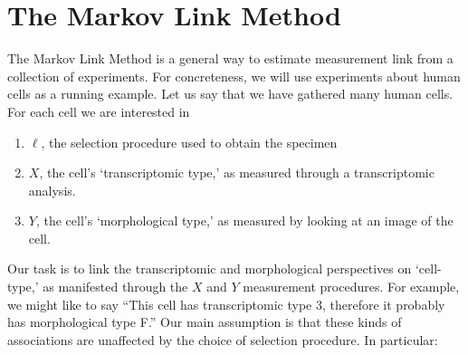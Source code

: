 %

\section{The Markov Link Method}

\label{sec:mlm}

The Markov Link Method is a general way to estimate measurement link from a collection of experiments.  For concreteness, we will use experiments about human cells as a running example.  Let us say that we have gathered many human cells.  For each cell we are interested in 
%
\begin{enumerate}
    \item $\ell$, the selection procedure used to obtain the specimen
    \item $X$, the cell's `transcriptomic type,' as measured through a transcriptomic analysis.  
    \item $Y$, the cell's `morphological type,' as measured by looking at an image of the cell.
\end{enumerate}
%
Our task is to link the transcriptomic and morphological perspectives on `cell-type,' as manifested through the $X$ and $Y$ measurement procedures.  For example, we might like to say ``This cell has transcriptomic type 3, therefore it probably has morphological type F.''  Our main assumption is that these kinds of associations are unaffected by the choice of selection procedure.  In particular:

\begin{center}
\end{center}

